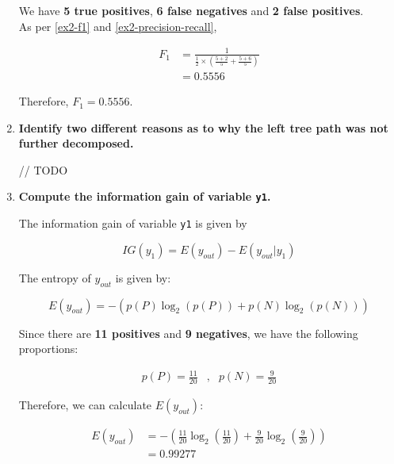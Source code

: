 \documentclass[12pt]{article}
\begin{document}
\begin{enumerate}[leftmargin=\labelsep]
          We have \textbf{5 true positives}, \textbf{6 false negatives} and \textbf{2 false positives}.\\
          As per \eqref{ex2-f1} and \eqref{ex2-precision-recall},

          \[
              \begin{aligned}
                  F_1 & = \frac{1}{\frac{1}{2} \times \left(\frac{5 + 2}{5} + \frac{5 + 6}{5}\right)} \\
                      & = 0.5556
              \end{aligned}
          \]

          Therefore, \(F_1 = 0.5556\).

    \item \textbf{Identify two different reasons as to why the left tree path was not further decomposed.}

          // TODO

    \item \textbf{Compute the information gain of variable \texttt{y1}.}

          The information gain of variable \texttt{y1} is given by

          \begin{equation}\label{ex4-ig}
              IG(y_1) = E(y_{out}) - E(y_{out} | y_1)
          \end{equation}

          The entropy of \(y_{out}\) is given by:

          \[
              E(y_{out}) = - \left(p(P) \log_2 \left(p(P)\right) + p(N) \log_2 \left(p(N)\right)\right)
          \]

          Since there are \textbf{11 positives} and \textbf{9 negatives}, we have the following proportions:

          \[
              \begin{array}{lcr}
                  p(P) = \frac{11}{20} & , & p(N) = \frac{9}{20}
              \end{array}
          \]

          Therefore, we can calculate $E(y_{out})$:

          \[
              \begin{aligned}
                  E(y_{out}) & = - \left(\frac{11}{20} \log_2\left(\frac{11}{20}\right) + \frac{9}{20} \log_2\left(\frac{9}{20}\right)\right) \\
                             & = 0.99277
              \end{aligned}
          \]


\end{enumerate}
\end{document}
